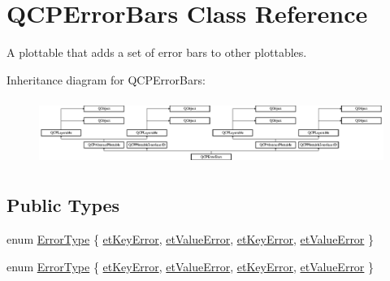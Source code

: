 \hypertarget{class_q_c_p_error_bars}{}\section{Q\+C\+P\+Error\+Bars Class Reference}
\label{class_q_c_p_error_bars}


A plottable that adds a set of error bars to other plottables.  


Inheritance diagram for Q\+C\+P\+Error\+Bars\+:\begin{figure}[H]
\begin{center}
\leavevmode
\includegraphics[height=2.173913cm]{class_q_c_p_error_bars}
\end{center}
\end{figure}
\subsection*{Public Types}
\begin{DoxyCompactItemize}
\item 
enum \hyperlink{class_q_c_p_error_bars_a95f0220f11a72648b96480a85ce26474}{Error\+Type} \{ \hyperlink{class_q_c_p_error_bars_a95f0220f11a72648b96480a85ce26474a5c1ff5857626236aec8084953e07d7ba}{et\+Key\+Error}, 
\hyperlink{class_q_c_p_error_bars_a95f0220f11a72648b96480a85ce26474ad2493fb1fe29121e70594749e5edef3f}{et\+Value\+Error}, 
\hyperlink{class_q_c_p_error_bars_a95f0220f11a72648b96480a85ce26474a5c1ff5857626236aec8084953e07d7ba}{et\+Key\+Error}, 
\hyperlink{class_q_c_p_error_bars_a95f0220f11a72648b96480a85ce26474ad2493fb1fe29121e70594749e5edef3f}{et\+Value\+Error}
 \}
\item 
enum \hyperlink{class_q_c_p_error_bars_a95f0220f11a72648b96480a85ce26474}{Error\+Type} \{ \hyperlink{class_q_c_p_error_bars_a95f0220f11a72648b96480a85ce26474a5c1ff5857626236aec8084953e07d7ba}{et\+Key\+Error}, 
\hyperlink{class_q_c_p_error_bars_a95f0220f11a72648b96480a85ce26474ad2493fb1fe29121e70594749e5edef3f}{et\+Value\+Error}, 
\hyperlink{class_q_c_p_error_bars_a95f0220f11a72648b96480a85ce26474a5c1ff5857626236aec8084953e07d7ba}{et\+Key\+Error}, 
\hyperlink{class_q_c_p_error_bars_a95f0220f11a72648b96480a85ce26474ad2493fb1fe29121e70594749e5edef3f}{et\+Value\+Error}
 \}
\end{DoxyCompactItemize}
